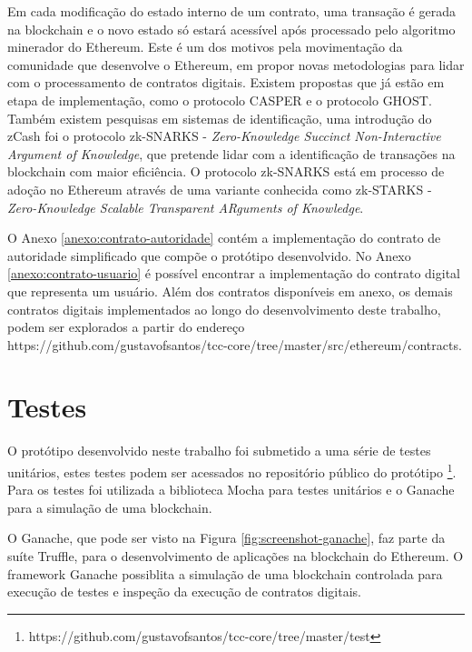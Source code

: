 \documentclass[tcc,capa]{texufpel}
\begin{document}
    Em cada modificação do estado interno de um contrato, uma transação é gerada na blockchain e o novo estado só estará acessível após processado pelo algoritmo minerador do Ethereum. Este é um dos motivos pela movimentação da comunidade que desenvolve o Ethereum, em propor novas metodologias para lidar com o processamento de contratos digitais. Existem propostas que já estão em etapa de implementação, como o protocolo CASPER e o protocolo GHOST. Também existem pesquisas em sistemas de identificação, uma introdução do zCash foi o protocolo zk-SNARKS - \textit{Zero-Knowledge Succinct Non-Interactive Argument of Knowledge}, que pretende lidar com a identificação de transações na blockchain com maior eficiência. O protocolo zk-SNARKS está em processo de adoção no Ethereum através de uma variante conhecida como zk-STARKS - \textit{Zero-Knowledge Scalable Transparent ARguments of Knowledge}.
    
    O Anexo \ref{anexo:contrato-autoridade} contém a implementação do contrato de autoridade simplificado que compõe o protótipo desenvolvido. No Anexo \ref{anexo:contrato-usuario} é possível encontrar a implementação do contrato digital que representa um usuário. Além dos contratos disponíveis em anexo, os demais contratos digitais implementados ao longo do desenvolvimento deste trabalho, podem ser explorados a partir do endereço https://github.com/gustavofsantos/tcc-core/tree/master/src/ethereum/contracts.
    
    \section{Testes}
    
    O protótipo desenvolvido neste trabalho foi submetido a uma série de testes unitários, estes testes podem ser acessados no repositório público do protótipo \footnote{https://github.com/gustavofsantos/tcc-core/tree/master/test}. Para os testes foi utilizada a biblioteca Mocha para testes unitários e o Ganache para a simulação de uma blockchain.
    
    O Ganache, que pode ser visto na Figura \ref{fig:screenshot-ganache}, faz parte da suíte Truffle, para o desenvolvimento de aplicações na blockchain do Ethereum. O framework Ganache possiblita a simulação de uma blockchain controlada para execução de testes e inspeção da execução de contratos digitais.
    
\end{document}
